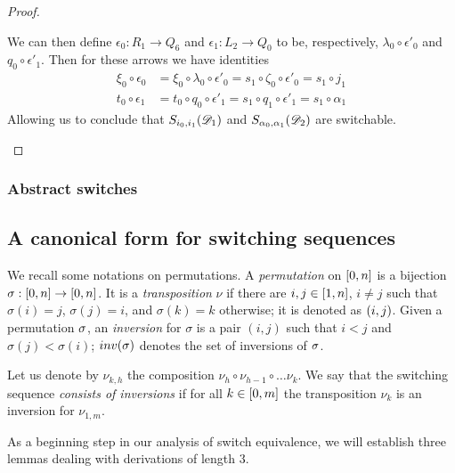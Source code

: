 \begin{proof}
\begin{enumerate}
		
		We can then define $\epsilon_0\colon R_1\to Q_6$ and $\epsilon_1\colon L_2\to Q_0$ to be, respectively, 
		$\lambda_0\circ \epsilon'_0$ and $q_0\circ
		\epsilon'_1$. Then for these  arrows we have  identities
		\begin{align*}
			\xi_0\circ \epsilon_0 & =\xi_0\circ \lambda_0\circ \epsilon'_0 =s_1\circ \zeta_0 \circ \epsilon'_0=s_1\circ j_1\\	t_0\circ \epsilon_1 & = t_0\circ q_0\circ \epsilon'_1 =s_1\circ q_1\circ \epsilon'_1=s_1\circ \alpha_1
		\end{align*}
		Allowing us to conclude that
		$S_{i_0,i_1}(\dder{D}_1)$ and $S_{\alpha_0,
			\alpha_1}(\dder{D}_2)$ are switchable.  \qedhere 
	\end{enumerate}
\end{proof}






\subsubsection{Abstract switches}



\subsection{A canonical form for switching sequences} 


We  recall some notations on permutations.  A \emph{permutation} on
$\interval[0]{n}$ is a bijection
$\sigma : \interval[0]{n} \to \interval[0]{n}$. It is a
\emph{transposition} $\nu$ if there are $i, j \in \interval{n}$,
$i \neq j$ such that $\sigma(i)=j$, $\sigma(j) = i$, and
$\sigma(k) = k$ otherwise; it is denoted as $\transp{i}[j]$. Given a permutation $\perm$, 
an \emph{inversion} for $\sigma$ is a pair $(i,j)$ such that $i<j$ and
$\sigma(j)< \sigma(i)$; $\inv{\sigma}$ denotes the set of
inversions of $\perm$.


Let us denote by $\nu_{k,h}$ the composition
$\nu_h \circ \nu_{h-1} \circ \ldots \nu_k$. We say that the
switching sequence \emph{consists of inversions} if for all
$k \in \interval[0]{m}$ the transposition $\nu_k$ is an inversion
for $\nu_{1,m}$.





As a beginning step in our analysis of switch equivalence, we will establish three lemmas  dealing with derivations of length $3$. 


